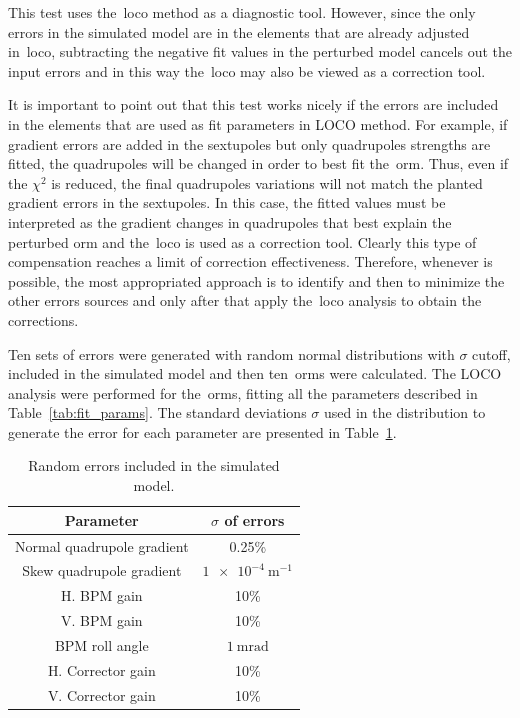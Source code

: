 This test uses the~\gls{loco} method as a diagnostic tool. However, since the only errors in the simulated model are in the elements that are already adjusted in~\gls{loco}, subtracting the negative fit values in the perturbed model cancels out the input errors and in this way the~\gls{loco} may also be viewed as a correction tool.

It is important to point out that this test works nicely if the errors are included in the elements that are used as fit parameters in LOCO method. For example, if gradient errors are added in the sextupoles but only quadrupoles strengths are fitted, the quadrupoles will be changed in order to best fit the~\gls{orm}. Thus, even if the $\chi^2$ is reduced, the final quadrupoles variations will not match the planted gradient errors in the sextupoles. In this case, the fitted values must be interpreted as the gradient changes in quadrupoles that best explain the perturbed \gls{orm} and the~\gls{loco} is used as a correction tool. Clearly this type of compensation reaches a limit of correction effectiveness. Therefore, whenever is possible, the most appropriated approach is to identify and then to minimize the other errors sources and only after that apply the~\gls{loco} analysis to obtain the corrections.

Ten sets of errors were generated with random normal distributions with $\sigma$ cutoff, included in the simulated model and then ten~\gls{orm}s were calculated. The LOCO analysis were performed for the~\gls{orm}s, fitting all the parameters described in Table~\ref{tab:fit_params}. The standard deviations $\sigma$ used in the distribution to generate the error for each parameter are presented in Table~\ref{tab:errors}.
\begin{table}
    \centering
    \caption{Random errors included in the simulated model.}
    \label{tab:errors}
    \begin{tabular}{cc}
        Parameter & $\sigma$ of errors \\ 
        \toprule\toprule
        Normal quadrupole gradient & 0.25\% \\
        Skew quadrupole gradient & $\SI{1e-4}{\meter^{-1}}$ \\
        H. BPM gain &  10\% \\
        V. BPM gain &  10\% \\
        BPM roll angle & $\SI{1}{\milli\radian}$ \\ 
        H. Corrector gain & 10\% \\
        V. Corrector gain &  10\% \\
        \bottomrule\bottomrule
    \end{tabular}
\end{table}

